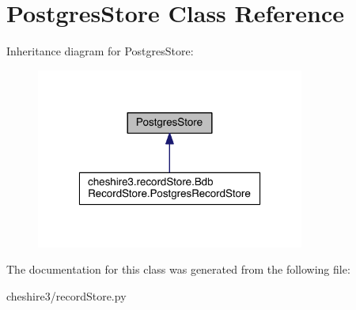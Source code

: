 \hypertarget{class_postgres_store}{\section{Postgres\-Store Class Reference}
\label{class_postgres_store}
}


Inheritance diagram for Postgres\-Store\-:
\nopagebreak
\begin{figure}[H]
\begin{center}
\leavevmode
\includegraphics[width=250pt]{class_postgres_store__inherit__graph}
\end{center}
\end{figure}


The documentation for this class was generated from the following file\-:\begin{DoxyCompactItemize}
\item 
cheshire3/record\-Store.\-py\end{DoxyCompactItemize}
